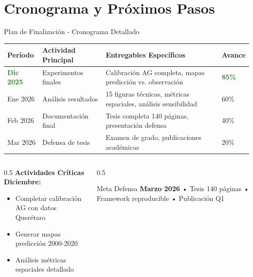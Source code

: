 \documentclass[aspectratio=169]{beamer}
\begin{document}
\section{Cronograma y Próximos Pasos}

\begin{frame}{Plan de Finalización - Cronograma Detallado}
  \begin{table}[h]
  \centering
  \footnotesize
  \begin{tabular}{p{2.5cm}p{3.5cm}p{4.5cm}p{1.5cm}}
  \toprule
  \textbf{Período} & \textbf{Actividad Principal} & \textbf{Entregables Específicos} & \textbf{Avance} \\
  \midrule
  \textcolor{ForestGreen}{\textbf{Dic 2025}} & Experimentos finales & 
  Calibración AG completa, mapas predicción vs. observación & \textcolor{ForestGreen}{\textbf{85\%}} \\
  \midrule
  Ene 2026 & Análisis resultados & 
  15 figuras técnicas, métricas espaciales, análisis sensibilidad & 60\% \\
  \midrule  
  Feb 2026 & Documentación final & 
  Tesis completa 140 páginas, presentación defensa & 40\% \\
  \midrule
  Mar 2026 & Defensa de tesis & 
  Examen de grado, publicaciones académicas & 20\% \\
  \bottomrule
  \end{tabular}
  \end{table}
  
\end{frame}

\begin{frame}
  \vspace{0.3cm}
  \begin{columns}
    \begin{column}{0.5\textwidth}
      \textbf{Actividades Críticas Diciembre:}
      \begin{itemize}
        \item Completar calibración AG con datos Querétaro
        \item Generar mapas predicción 2000-2020
        \item Análisis métricas espaciales detallado
      \end{itemize}
    \end{column}
    \begin{column}{0.5\textwidth}
      \begin{alertblock}{Meta Defensa}
      \textbf{Marzo 2026} • Tesis 140 páginas • 
      Framework reproducible • Publicación Q1
      \end{alertblock}
    \end{column}
  \end{columns}
\end{frame}
\end{document}
